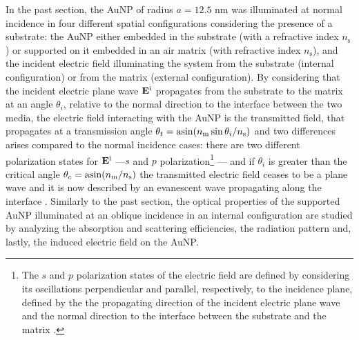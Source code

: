 
In the past section, the AuNP of radius $a = 12.5$ nm was illuminated at normal incidence in four different spatial configurations considering the  presence of a substrate: the AuNP either embedded in the substrate (with a refractive index $n_\text{s}$) or supported on it embedded in an air matrix (with refractive index $n_\text{s}$), and the incident electric field  illuminating the system from the substrate (internal configuration) or from the matrix (external configuration). By considering that the incident electric plane wave $\vb{E}^\text{i}$  propagates from the substrate to the matrix at an angle $\theta_i$, relative to the normal direction to the interface between the two media, the electric field interacting with the AuNP is the transmitted field, that propagates at a transmission angle $\theta_t = \asin(n_\text{m}\sin\theta_i/n_\text{s})$ \cite{born_max_principle_1999} and two differences arises compared to the normal incidence cases: there are two different polarization states for $\vb{E}^\text{i}$ ---$s$ and $p$ polarization\footnote{%
    The $s$ and $p$ polarization states of the electric field are defined by considering its oscillations perpendicular and parallel, respectively, to the incidence plane, defined by the the propagating direction of the incident electric plane wave and the normal direction to the interface between the substrate and the matrix \cite{bohren_absorption_1983}.}%
--- and if $\theta_i$ is greater than the critical angle $\theta_c = \asin(n_\text{m}/n_\text{s})$ the transmitted electric field ceases to be a plane wave and it is now described by an evanescent wave propagating along the interface  \cite{born_max_principle_1999}. Similarly to the past section, the optical properties of the supported AuNP illuminated at an oblique incidence in an internal configuration are studied by analyzing the absorption and scattering efficiencies, the radiation pattern and, lastly, the induced electric field on the AuNP.

